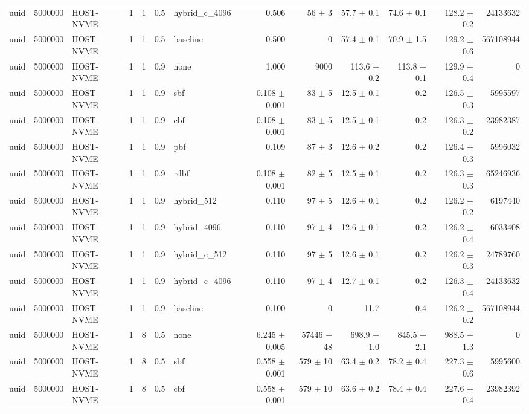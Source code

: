 \begin{tabular}{lllllllrrrrrr}
uuid & 5000000 & HOST-NVME & 1 & 1 & 0.5 & hybrid\_c\_4096 & 0.506 & 56 $\pm$ 3 & 57.7 $\pm$ 0.1 & 74.6 $\pm$ 0.1 & 128.2 $\pm$ 0.2 & 24133632 \\
uuid & 5000000 & HOST-NVME & 1 & 1 & 0.5 & baseline & 0.500 & 0 & 57.4 $\pm$ 0.1 & 70.9 $\pm$ 1.5 & 129.2 $\pm$ 0.6 & 567108944 \\
uuid & 5000000 & HOST-NVME & 1 & 1 & 0.9 & none & 1.000 & 9000 & 113.6 $\pm$ 0.2 & 113.8 $\pm$ 0.1 & 129.9 $\pm$ 0.4 & 0 \\
uuid & 5000000 & HOST-NVME & 1 & 1 & 0.9 & sbf & 0.108 $\pm$ 0.001 & 83 $\pm$ 5 & 12.5 $\pm$ 0.1 & 0.2 & 126.5 $\pm$ 0.3 & 5995597 \\
uuid & 5000000 & HOST-NVME & 1 & 1 & 0.9 & cbf & 0.108 $\pm$ 0.001 & 83 $\pm$ 5 & 12.5 $\pm$ 0.1 & 0.2 & 126.3 $\pm$ 0.2 & 23982387 \\
uuid & 5000000 & HOST-NVME & 1 & 1 & 0.9 & pbf & 0.109 & 87 $\pm$ 3 & 12.6 $\pm$ 0.2 & 0.2 & 126.4 $\pm$ 0.3 & 5996032 \\
uuid & 5000000 & HOST-NVME & 1 & 1 & 0.9 & rdbf & 0.108 $\pm$ 0.001 & 82 $\pm$ 5 & 12.5 $\pm$ 0.1 & 0.2 & 126.3 $\pm$ 0.3 & 65246936 \\
uuid & 5000000 & HOST-NVME & 1 & 1 & 0.9 & hybrid\_512 & 0.110 & 97 $\pm$ 5 & 12.6 $\pm$ 0.1 & 0.2 & 126.2 $\pm$ 0.2 & 6197440 \\
uuid & 5000000 & HOST-NVME & 1 & 1 & 0.9 & hybrid\_4096 & 0.110 & 97 $\pm$ 4 & 12.6 $\pm$ 0.1 & 0.2 & 126.2 $\pm$ 0.4 & 6033408 \\
uuid & 5000000 & HOST-NVME & 1 & 1 & 0.9 & hybrid\_c\_512 & 0.110 & 97 $\pm$ 5 & 12.6 $\pm$ 0.1 & 0.2 & 126.2 $\pm$ 0.3 & 24789760 \\
uuid & 5000000 & HOST-NVME & 1 & 1 & 0.9 & hybrid\_c\_4096 & 0.110 & 97 $\pm$ 4 & 12.7 $\pm$ 0.1 & 0.2 & 126.3 $\pm$ 0.4 & 24133632 \\
uuid & 5000000 & HOST-NVME & 1 & 1 & 0.9 & baseline & 0.100 & 0 & 11.7 & 0.4 & 126.2 $\pm$ 0.2 & 567108944 \\
uuid & 5000000 & HOST-NVME & 1 & 8 & 0.5 & none & 6.245 $\pm$ 0.005 & 57446 $\pm$ 48 & 698.9 $\pm$ 1.0 & 845.5 $\pm$ 2.1 & 988.5 $\pm$ 1.3 & 0 \\
uuid & 5000000 & HOST-NVME & 1 & 8 & 0.5 & sbf & 0.558 $\pm$ 0.001 & 579 $\pm$ 10 & 63.4 $\pm$ 0.2 & 78.2 $\pm$ 0.4 & 227.3 $\pm$ 0.6 & 5995600 \\
uuid & 5000000 & HOST-NVME & 1 & 8 & 0.5 & cbf & 0.558 $\pm$ 0.001 & 579 $\pm$ 10 & 63.6 $\pm$ 0.2 & 78.4 $\pm$ 0.4 & 227.6 $\pm$ 0.4 & 23982392 \\

\end{tabular}
